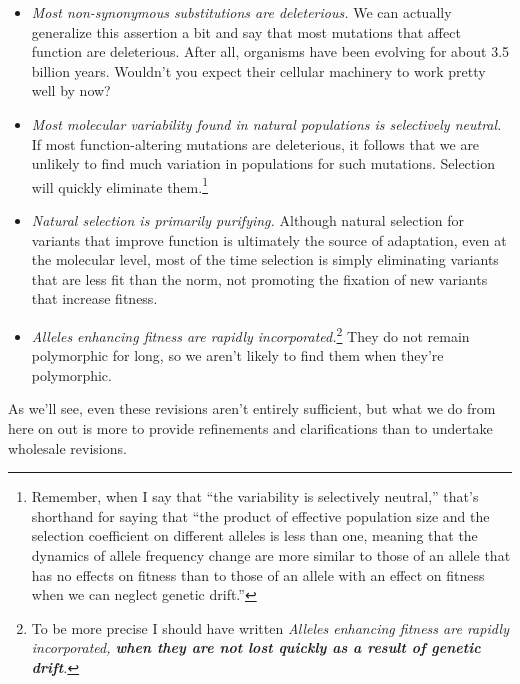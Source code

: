 \documentclass[12pt]{article}
\begin{document}
\begin{itemize}

\item {\it Most non-synonymous substitutions are deleterious.\/} We
  can actually generalize this assertion a bit and say that most
  mutations that affect function are deleterious. After all, organisms
  have been evolving for about 3.5 billion years. Wouldn't you expect
  their cellular machinery to work pretty well by now?

\item {\it Most molecular variability found in natural populations is
    selectively neutral.} If most function-altering mutations are
  deleterious, it follows that we are unlikely to find much variation
  in populations for such mutations. Selection will quickly eliminate
  them.\footnote{Remember, when I say that ``the variability is
    selectively neutral,'' that's shorthand for saying that ``the
    product of effective population size and the selection coefficient
    on different alleles is less than one, meaning that the dynamics
    of allele frequency change are more similar to those of an allele
    that has no effects on fitness than to those of an allele with an
    effect on fitness when we can neglect genetic drift.''}

\item {\it Natural selection is primarily purifying.} Although natural
  selection for variants that improve function is ultimately the
  source of adaptation, even at the molecular level, most of the time
  selection is simply eliminating variants that are less fit than the
  norm, not promoting the fixation of new variants that increase
  fitness.

\item {\it Alleles enhancing fitness are rapidly
    incorporated.}\footnote{To be more precise I should have written
    {\it Alleles enhancing fitness are rapidly incorporated, {\bf when
        they are not lost quickly as a result of genetic drift}.\/}}
  They do not remain polymorphic for long, so we aren't likely to find
  them when they're polymorphic.

\end{itemize}

As we'll see, even these revisions aren't entirely sufficient, but
what we do from here on out is more to provide refinements and
clarifications than to undertake wholesale revisions.




\ccLicense
\end{document}
